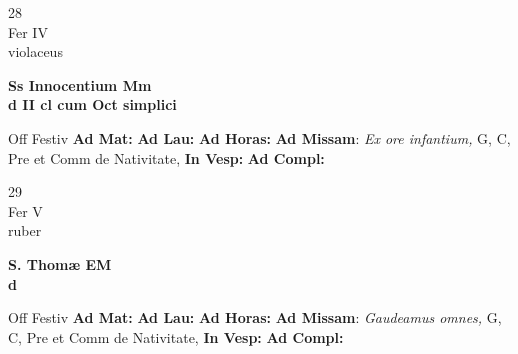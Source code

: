 \documentclass[10pt, openany]{book}
\begin{document}
        \begin{center}
            \begin{minipage}{3.5in}
                \vspace{2em}
                \begin{minipage}{0.5in}
                    {\Huge 28} \\
                    {\normalsize Fer IV} \\
                    {\normalsize violaceus}
                \end{minipage}
                \begin{minipage}{3.0in}
                    \textbf{ \large Ss Innocentium Mm \\
                    \textnormal{\normalsize d II cl cum Oct simplici}} \\ 
                \end{minipage}
                \begin{justify}Off Festiv
                    \textbf{Ad Mat: }
                    \textbf{Ad Lau: }
                    \textbf{Ad Horas: }\textbf{Ad Missam}: \textit{Ex ore infantium,} G, C, Pre et Comm de Nativitate,  
                    \textbf{In Vesp: }
                    \textbf{Ad Compl: }
                \end{justify}
            \end{minipage}
        \end{center}
    
        \begin{center}
            \begin{minipage}{3.5in}
                \vspace{2em}
                \begin{minipage}{0.5in}
                    {\Huge 29} \\
                    {\normalsize Fer V} \\
                    {\normalsize ruber}
                \end{minipage}
                \begin{minipage}{3.0in}
                    \textbf{ \large S. Thomæ EM \\
                    \textnormal{\normalsize d}} \\ 
                \end{minipage}
                \begin{justify}Off Festiv
                    \textbf{Ad Mat: }
                    \textbf{Ad Lau: }
                    \textbf{Ad Horas: }\textbf{Ad Missam}: \textit{Gaudeamus omnes,} G, C, Pre et Comm de Nativitate,  
                    \textbf{In Vesp: }
                    \textbf{Ad Compl: }
                \end{justify}
            \end{minipage}
        \end{center}
    
\end{document}
